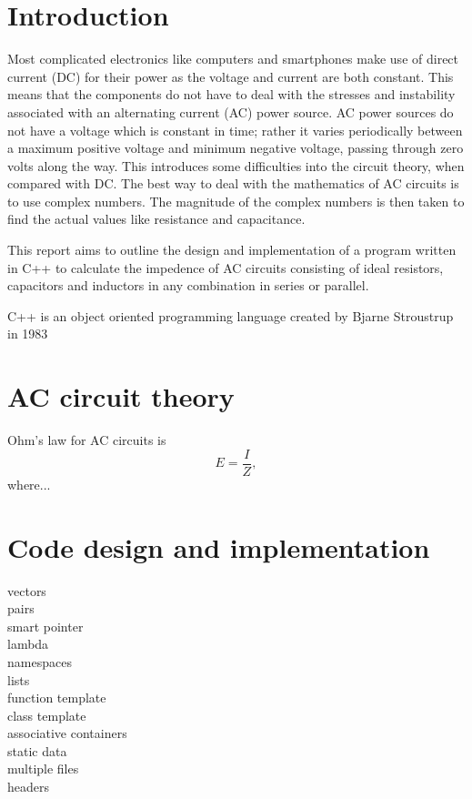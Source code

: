 \documentclass[10pt,a4paper,twoside]{article}
\begin{document}
  \begin{multicols}{2}
    \section*{Introduction}
    Most complicated electronics like computers and smartphones make use of direct current (DC) for their power as the voltage and current are both constant. This means that the components do not have to deal with the stresses and instability associated with an alternating current (AC) power source. AC power sources do not have a voltage which is constant in time; rather it varies periodically between a maximum positive voltage and minimum negative voltage, passing through zero volts along the way. This introduces some difficulties into the circuit theory, when compared with DC. The best way to deal with the mathematics of AC circuits is to use complex numbers. The magnitude of the complex numbers is then taken to find the actual values like resistance and capacitance.

    This report aims to outline the design and implementation of a program written in C++ to calculate the impedence of AC circuits consisting of ideal resistors, capacitors and inductors in any combination in series or parallel.

    C++ is an object oriented programming language created by Bjarne Stroustrup in 1983

      \cite{ref:3}

    \section*{AC circuit theory}
      Ohm's law for AC circuits is
      \begin{equation}\label{eqn:1}
        E=\frac{I}{Z},
      \end{equation}
      where...\cite{ref:4}

    \section*{Code design and implementation}
    vectors\\
    pairs\\
    smart pointer\\
    lambda\\
    namespaces\\
    lists\\
    function template\\
    class template\\
    associative containers\\
    static data\\
    multiple files\\
    headers\\


\end{multicols}
\end{document}
